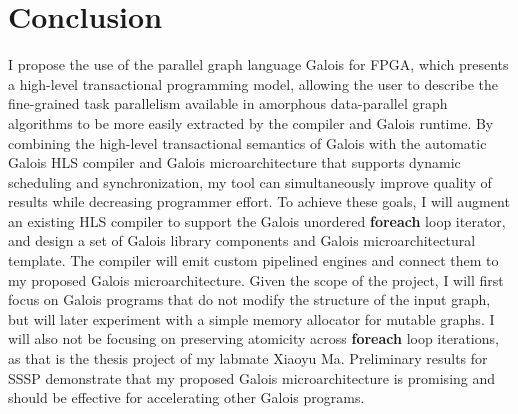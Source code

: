\section{Conclusion}\label{sect:conclusion}
I propose the use of the parallel graph language Galois for FPGA, which presents a high-level transactional programming 
model, allowing the user to describe the fine-grained task parallelism available in amorphous data-parallel graph algorithms to be more easily 
extracted by the compiler and Galois runtime. By combining the high-level transactional semantics of Galois with 
the automatic Galois HLS compiler and Galois microarchitecture that supports dynamic scheduling and synchronization, my tool can simultaneously improve 
quality of results while decreasing programmer effort. To achieve these goals, I will augment an existing HLS compiler 
to support the Galois unordered \textbf{foreach} loop iterator, and design a set of Galois library components and 
Galois microarchitectural template. The compiler will emit custom pipelined engines and connect them to my proposed Galois 
microarchitecture. Given the scope of the project, I will first focus on Galois programs that do not modify the structure of 
the input graph, but will later experiment with a simple memory allocator for mutable graphs. 
I will also not be focusing on preserving atomicity across \textbf{foreach} loop iterations, as that 
is the thesis project of my labmate Xiaoyu Ma. Preliminary results for SSSP demonstrate that my proposed Galois 
microarchitecture is promising and should be effective for accelerating other Galois programs.
